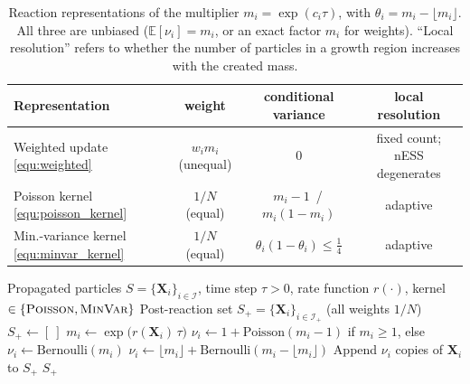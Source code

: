\documentclass[a4paper,fleqn]{cas-sc}
\theoremstyle{definition}
\theoremstyle{remark}
\begin{document}
\begin{table}[t]
\centering
\caption{Reaction representations of the multiplier $m_i=\exp(c_i\tau)$, with $\theta_i=m_i-\lfloor m_i\rfloor$.
All three are unbiased ($\mathbb E[\nu_i]=m_i$, or an exact factor $m_i$ for weights). ``Local resolution''
refers to whether the number of particles in a growth region increases with the created mass.}
\label{tab:kernels}
\begin{tabular}{lccc}
\hline
Representation & weight & conditional variance & local resolution \\
\hline
Weighted update \eqref{equ:weighted}        & $w_i m_i$ (unequal) & $0$ & fixed count; nESS degenerates \\
Poisson kernel \eqref{equ:poisson_kernel}   & $1/N$ (equal) & $m_i-1$ \,/\, $m_i(1-m_i)$ & adaptive \\
Min.-variance kernel \eqref{equ:minvar_kernel} & $1/N$ (equal) & $\theta_i(1-\theta_i)\le \tfrac14$ & adaptive \\
\hline
\end{tabular}
\end{table}


\begin{algorithm}
\caption{Equal-weight reaction (branching) step}\label{alg:birthdeath}
\begin{algorithmic}[1]
\Require Propagated particles $S=\{\mathbf X_{i}\}_{i\in\mathcal I}$, time step $\tau>0$, rate function $r(\cdot)$, kernel $\in\{\textsc{Poisson},\textsc{MinVar}\}$
\Ensure Post-reaction set $S_{+}=\{\mathbf X_{i}\}_{i\in\mathcal I_{+}}$ (all weights $1/N$)
    \State $S_{+}\gets [\ ]$
        \State $m_i \gets \exp\!\big(r(\mathbf X_{i})\,\tau\big)$
         \label{alg:line:birth}
            \State $\nu_i \gets 1+\mathrm{Poisson}(m_i-1)$ if $m_i\ge1$, else $\nu_i\gets\mathrm{Bernoulli}(m_i)$
        \Else {}
            \State $\nu_i \gets \lfloor m_i\rfloor + \mathrm{Bernoulli}(m_i-\lfloor m_i\rfloor)$ \label{alg:line:death}
        \EndIf
        \State Append $\nu_i$ copies of $\mathbf X_{i}$ to $S_{+}$
    \EndFor
    \State \Return $S_{+}$
\EndProcedure
\end{algorithmic}
\end{algorithm}
\end{document}

